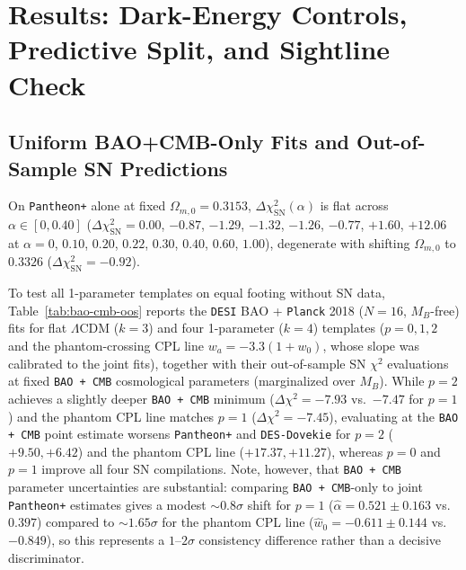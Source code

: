 \documentclass[11pt,a4paper]{article}
\begin{document}
\section{Results: Dark-Energy Controls, Predictive Split, and Sightline Check}
\label{sec:results}
\subsection{Uniform BAO+CMB-Only Fits and Out-of-Sample SN Predictions}
On \texttt{Pantheon+} alone at fixed $\Omega_{m,0} = 0.3153$, $\Delta\chi^2_{\mathrm{SN}}(\alpha)$ is flat across $\alpha \in [0, 0.40]$ ($\Delta\chi^2_{\mathrm{SN}} = 0.00$, $-0.87$, $-1.29$, $-1.32$, $-1.26$, $-0.77$, $+1.60$, $+12.06$ at $\alpha = 0$, $0.10$, $0.20$, $0.22$, $0.30$, $0.40$, $0.60$, $1.00$), degenerate with shifting $\Omega_{m,0}$ to $0.3326$ ($\Delta\chi^2_{\mathrm{SN}} = -0.92$).

To test all 1-parameter templates on equal footing without SN data, Table~\ref{tab:bao-cmb-oos} reports the \texttt{DESI} BAO + \texttt{Planck} 2018 ($N = 16$, $M_B$-free) fits for flat $\Lambda$CDM ($k = 3$) and four 1-parameter ($k = 4$) templates ($p = 0, 1, 2$ and the phantom-crossing CPL line $w_a = -3.3(1+w_0)$, whose slope was calibrated to the joint fits), together with their out-of-sample SN $\chi^2$ evaluations at fixed \texttt{BAO + CMB} cosmological parameters (marginalized over $M_B$). While $p = 2$ achieves a slightly deeper \texttt{BAO + CMB} minimum ($\Delta\chi^2 = -7.93$ vs.\ $-7.47$ for $p = 1$) and the phantom CPL line matches $p = 1$ ($\Delta\chi^2 = -7.45$), evaluating at the \texttt{BAO + CMB} point estimate worsens \texttt{Pantheon+} and \texttt{DES-Dovekie} for $p = 2$ ($+9.50, +6.42$) and the phantom CPL line ($+17.37, +11.27$), whereas $p = 0$ and $p = 1$ improve all four SN compilations. Note, however, that \texttt{BAO + CMB} parameter uncertainties are substantial: comparing \texttt{BAO + CMB}-only to joint \texttt{Pantheon+} estimates gives a modest $\sim 0.8\sigma$ shift for $p = 1$ ($\hat{\alpha} = 0.521 \pm 0.163$ vs.\ $0.397$) compared to $\sim 1.65\sigma$ for the phantom CPL line ($\hat{w}_0 = -0.611 \pm 0.144$ vs.\ $-0.849$), so this represents a $1\text{--}2\sigma$ consistency difference rather than a decisive discriminator.
\end{document}
